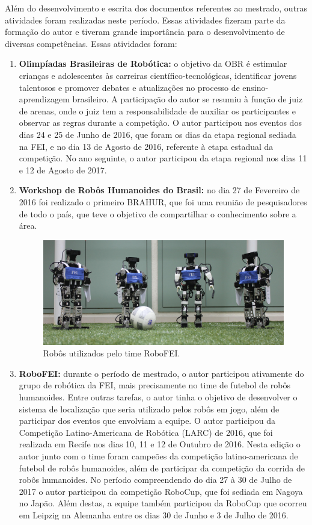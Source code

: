 \documentclass[
  12pt,       %
  oneside,
  a4paper,      %
  english,      %
  french,       %
  spanish,      %
  brazil,       %
  ]{abntex2}
\begin{document}
Além do desenvolvimento e escrita dos documentos referentes ao mestrado, outras atividades foram realizadas neste período.
Essas atividades fizeram parte da formação do autor e tiveram grande importância para o desenvolvimento de diversas competências.
Essas atividades foram:
%
\begin{enumerate}
  \item \textbf{Olimpíadas Brasileiras de Robótica:} o objetivo da OBR é estimular crianças e adolescentes às carreiras científico-tecnológicas, identificar jovens talentosos e promover debates e atualizações no processo de ensino-aprendizagem brasileiro.
  A participação do autor se resumiu à função de juiz de arenas, onde o juiz tem a responsabilidade de auxiliar os participantes e observar as regras durante a competição.
  O autor participou nos eventos dos dias 24 e 25 de Junho de 2016, que foram os dias da etapa regional sediada na FEI, e no dia 13 de Agosto de 2016, referente à etapa estadual da competição.
  No ano seguinte, o autor participou da etapa regional nos dias 11 e 12 de Agosto de 2017.

  \item \textbf{Workshop de Robôs Humanoides do Brasil:} no dia 27 de Fevereiro de 2016 foi realizado o primeiro BRAHUR, que foi uma reunião de pesquisadores de todo o país, que teve o objetivo de compartilhar o conhecimento sobre a área.

\begin{figure}[t]
  \centering
  \caption{Robôs utilizados pelo time RoboFEI.}\label{fig:robo}
    \includegraphics[width=\textwidth]{fig/team-2016}
\end{figure}

  \item \textbf{RoboFEI:} durante o período de mestrado, o autor participou ativamente do grupo de robótica da FEI, mais precisamente no time de futebol de robôs humanoides.
  Entre outras tarefas, o autor tinha o objetivo de desenvolver o sistema de localização que seria utilizado pelos robôs em jogo, além de participar dos eventos que envolviam a equipe.
  O autor participou da Competição Latino-Americana de Robótica (LARC) de 2016, que foi realizada em Recife nos dias 10, 11 e 12 de Outubro de 2016.
  Nesta edição o autor junto com o time foram campeões da competição latino-americana de futebol de robôs humanoides, além de participar da competição da corrida de robôs humanoides.
  No período compreendendo do dia 27 à 30 de Julho de 2017 o autor participou da competição RoboCup, que foi sediada em Nagoya no Japão.
  Além destas, a equipe também participou da RoboCup que ocorreu em Leipzig na Alemanha entre os dias 30 de Junho e 3 de Julho de 2016.


\end{enumerate}
\end{document}
